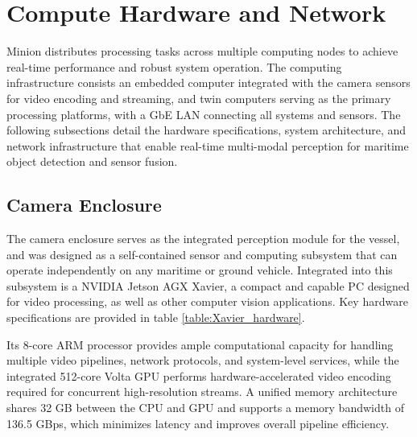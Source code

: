 \documentclass{erauthesis}
\begin{document}
\section{Compute Hardware and Network} \label{sec:Atlas_LAN}

Minion distributes processing tasks across multiple computing nodes to achieve real-time performance and robust system operation.
The computing infrastructure consists an embedded computer integrated with the camera sensors for video encoding and streaming, and twin computers serving as the primary processing platforms, with a \ac{GbE} \ac{LAN} connecting all systems and sensors. 
The following subsections detail the hardware specifications, system architecture, and network infrastructure that enable real-time multi-modal perception for maritime object detection and sensor fusion.

\subsection{Camera Enclosure} \label{comp:camera_enclosure}


The camera enclosure serves as the integrated perception module for the vessel, and was designed as a self-contained sensor and computing subsystem that can operate independently on any maritime or ground vehicle. 
Integrated into this subsystem is a NVIDIA Jetson AGX Xavier, a compact and capable PC designed for video processing, as well as other computer vision applications.
Key hardware specifications are provided in table \ref{table:Xavier_hardware}.

Its 8-core ARM processor provides ample computational capacity for handling multiple video pipelines, network protocols, and system-level services, while the integrated 512-core Volta GPU performs hardware-accelerated video encoding required for concurrent high-resolution streams.  
A unified memory architecture shares 32 GB between the CPU and GPU and supports a memory bandwidth of 136.5 GBps, which minimizes latency and improves overall pipeline efficiency.
\end{document}
